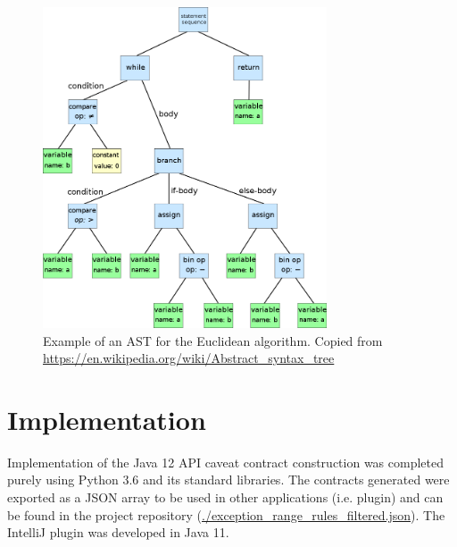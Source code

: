 \begin{figure}
	\label{fig:ast}
	\centering
	\includegraphics[width=0.75\textwidth]{figs/ast.png}
	\caption{Example of an AST for the Euclidean algorithm. Copied from \url{https://en.wikipedia.org/wiki/Abstract\_syntax\_tree}}
\end{figure}

\section{Implementation}
\label{sec:contract-implement}
Implementation of the Java 12 API caveat contract construction was completed purely using Python 3.6 and its standard libraries. The contracts generated were exported as a JSON array to be used in other applications (i.e. plugin) and can be found in the project repository (\url{./exception_range_rules_filtered.json}). The IntelliJ plugin was developed in Java 11.

